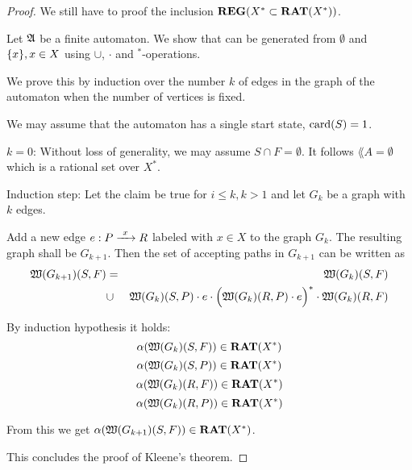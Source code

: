 \begin{proof}
We still have to proof the inclusion $\mbox{{\bf REG}}(X^* \subset \mbox{{\bf RAT}}(X^*))$.

Let $\mbox{$\mathfrak{A}$}$ be a finite automaton. We show that  can be generated
from $\emptyset$ and $\mbox{$\{x\}$}, x \in X$	using $\cup$, $\cdot$ and
$^*$-operations.

We prove this by induction over the number $k$ of edges in the graph of the
automaton when the number of vertices is fixed.

We may assume that the automaton has a single start state, $\mathrm{card}({S}) = 1$.

$k = 0$: Without loss of generality, we may assume $S \cap F = \emptyset$. It
follows $\lang{A} = \emptyset$ which is a rational set over $X^*$.

Induction step: Let the claim be true for $i \leq k, k > 1$ and let $G_k$ be a
graph with $k$ edges.

Add a new edge $e : P \xrightarrow{\ {x}\ } R$ labeled with $x \in X$ to the graph $G_k$. The
resulting graph shall be $G_{k+1}$. Then the set of accepting paths in $G_{k+1}$
can be written as \begin{eqnarray*}
 \mbox{$\mathfrak{W}({G_{k+1}})$}(S, F) & = & \mbox{$\mathfrak{W}({G_k})$}(S, F) \\
 & \cup & \mbox{$\mathfrak{W}({G_k})$}(S, P) \cdot e \cdot \Big( \mbox{$\mathfrak{W}({G_k})$}(R, P) \cdot
 e \Big)^* \cdot \mbox{$\mathfrak{W}({G_k})$}(R, F)
\end{eqnarray*}

\missingfigure

By induction hypothesis it holds:
\[ \alpha(\mbox{$\mathfrak{W}({G_k})$}(S, F)) \in \mbox{{\bf RAT}}(X^*) \]
\[ \alpha(\mbox{$\mathfrak{W}({G_k})$}(S, P)) \in \mbox{{\bf RAT}}(X^*) \]
\[ \alpha(\mbox{$\mathfrak{W}({G_k})$}(R, F)) \in \mbox{{\bf RAT}}(X^*) \]
\[ \alpha(\mbox{$\mathfrak{W}({G_k})$}(R, P)) \in \mbox{{\bf RAT}}(X^*) \]

From this we get $\alpha(\mbox{$\mathfrak{W}({G_{k+1}})$}(S, F)) \in \mbox{{\bf RAT}}(X^*)$.

This concludes the proof of Kleene's theorem.
\end{proof}

